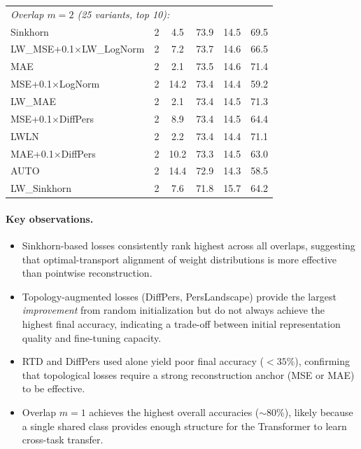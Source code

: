 \documentclass{article}
\begin{document}
\begin{table}[h]
\begin{tabular}{llcccc}
    \midrule
    \multicolumn{6}{l}{\textit{Overlap $m=2$ (25 variants, top 10):}} \\
    Sinkhorn & 2 & 4.5 & 73.9 & 14.5 & 69.5 \\
    LW\_MSE+0.1$\times$LW\_LogNorm & 2 & 7.2 & 73.7 & 14.6 & 66.5 \\
    MAE & 2 & 2.1 & 73.5 & 14.6 & 71.4 \\
    MSE+0.1$\times$LogNorm & 2 & 14.2 & 73.4 & 14.4 & 59.2 \\
    LW\_MAE & 2 & 2.1 & 73.4 & 14.5 & 71.3 \\
    MSE+0.1$\times$DiffPers & 2 & 8.9 & 73.4 & 14.5 & 64.4 \\
    LWLN & 2 & 2.2 & 73.4 & 14.4 & 71.1 \\
    MAE+0.1$\times$DiffPers & 2 & 10.2 & 73.3 & 14.5 & 63.0 \\
    AUTO & 2 & 14.4 & 72.9 & 14.3 & 58.5 \\
    LW\_Sinkhorn & 2 & 7.6 & 71.8 & 15.7 & 64.2 \\
    \bottomrule
  \end{tabular}
\end{table}

\paragraph{Key observations.}
\begin{itemize}[nosep]
  \item Sinkhorn-based losses consistently rank highest across all overlaps,
        suggesting that optimal-transport alignment of weight distributions
        is more effective than pointwise reconstruction.
  \item Topology-augmented losses (DiffPers, PersLandscape) provide the
        largest \emph{improvement} from random initialization but do not
        always achieve the highest final accuracy, indicating a trade-off
        between initial representation quality and fine-tuning capacity.
  \item RTD and DiffPers used alone yield poor final accuracy ($<35\%$),
        confirming that topological losses require a strong reconstruction
        anchor (MSE or MAE) to be effective.
  \item Overlap $m=1$ achieves the highest overall accuracies ($\sim$80\%),
        likely because a single shared class provides enough structure for
        the Transformer to learn cross-task transfer.
\end{itemize}
\end{document}
